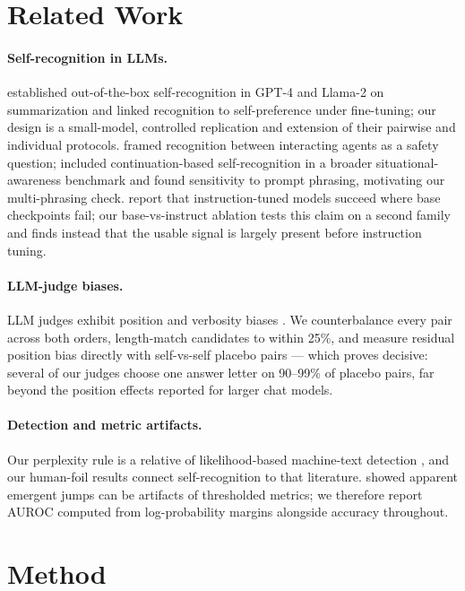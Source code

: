 \documentclass[11pt]{article}
\begin{document}
\section{Related Work}
\paragraph{Self-recognition in LLMs.}
\citet{panickssery2024llm} established out-of-the-box self-recognition in
GPT-4 and Llama-2 on summarization and linked recognition to
self-preference under fine-tuning; our design is a small-model, controlled
replication and extension of their pairwise and individual protocols.
\citet{davidson2024self} framed recognition between interacting agents as
a safety question; \citet{laine2024me} included continuation-based
self-recognition in a broader situational-awareness benchmark and found
sensitivity to prompt phrasing, motivating our multi-phrasing check.
\citet{zhou2025implicit} report that instruction-tuned models succeed
where base checkpoints fail; our base-vs-instruct ablation tests this
claim on a second family and finds instead that the usable signal is
largely present before instruction tuning.

\paragraph{LLM-judge biases.}
LLM judges exhibit position and verbosity biases \citep{zheng2023judging}.
We counterbalance every pair across both orders, length-match candidates
to within 25\%, and measure residual position bias directly with
self-vs-self placebo pairs --- which proves decisive: several of our
judges choose one answer letter on 90--99\% of placebo pairs, far beyond
the position effects reported for larger chat models.

\paragraph{Detection and metric artifacts.}
Our perplexity rule is a relative of likelihood-based machine-text
detection \citep{mitchell2023detectgpt}, and our human-foil results
connect self-recognition to that literature. \citet{schaeffer2023emergent}
showed apparent emergent jumps can be artifacts of thresholded metrics; we
therefore report AUROC computed from log-probability margins alongside
accuracy throughout.

\section{Method}
\end{document}
